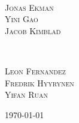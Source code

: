 \documentclass[11pt, titlepage]{article} %
\begin{document}
\begin{titlepage}
	\HRule\\[1.5cm]	
	
	
	\begin{minipage}{0.4\textwidth}
		\begin{flushleft}
			\large
                        \textsc{Jonas Ekman}
			\\
			\textsc{Yini Gao}
                        \\
                        \textsc{Jacob Kimblad}
		\end{flushleft}
	\end{minipage}
	~
	\begin{minipage}{0.4\textwidth}
		\begin{flushright}
			\large
                        \textsc{Leon Fernandez}
			\\
			\textsc{Fredrik Hyyrynen}
                        \\
                        \textsc{Yifan Ruan}
		\end{flushright}
	\end{minipage}
	
	
	
	\vfill\vfill\vfill %
	
	{\large\today} %
	
	
	 
	
	\vfill %
	
\end{titlepage}
\end{document}
